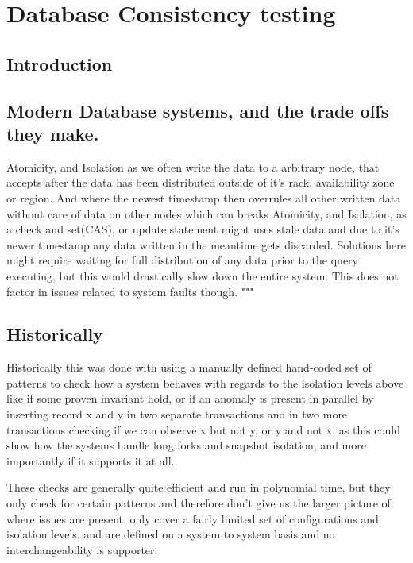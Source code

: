 \documentclass[a4paper,10pt,titlepage]{report}
\begin{document}
    \newpage

    \chapter{Database Consistency testing}

    \section{Introduction}


    \section{Modern Database systems, and the trade offs they make.}

    Atomicity, and Isolation as we often write the data to a arbitrary node, that accepts after the data has been distributed outside of it's rack, availability zone or region. And where the newest timestamp then overrules all other written data without care of data on other nodes which can breaks Atomicity, and Isolation, as a check and set(CAS), or update statement might uses stale data and due to it's newer timestamp any data written in the meantime gets discarded. Solutions here might require waiting for full distribution of any data prior to the query executing, but this would drastically slow down the entire system. This does not factor in issues related to system faults though.
    """


    \section{Historically}

    Historically this was done with using a manually defined hand-coded set of patterns to check how a system behaves with regards to the isolation levels above like if some proven invariant hold, or if an anomaly is present in parallel  by inserting record x and y in two separate transactions and in two more transactions checking if we can observe x but not y, or y and not x, as this could show how the systems handle long forks and snapshot isolation, and more importantly if it supports it at all.

    These checks are generally quite efficient and run in polynomial time, but they only check for certain patterns and therefore don't give us the larger picture of where issues are present.  only cover a fairly limited set of configurations and isolation levels, and are defined on a system to system basis and no interchangeability is supporter.
\end{document}
